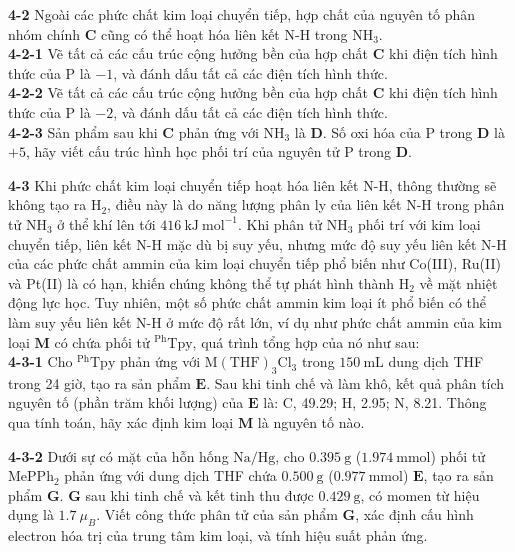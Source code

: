 \vspace{0.2cm}

\noindent
\textbf{4-2} Ngoài các phức chất kim loại chuyển tiếp, hợp chất của nguyên tố phân nhóm chính $\mathbf{C}$ cũng có thể hoạt hóa liên kết N-H trong $\mathrm{NH_3}$. \\
\textbf{4-2-1} Vẽ tất cả các cấu trúc cộng hưởng bền của hợp chất $\mathbf{C}$ khi điện tích hình thức của $\mathrm{P}$ là $-1$, và đánh dấu tất cả các điện tích hình thức. \\
\textbf{4-2-2} Vẽ tất cả các cấu trúc cộng hưởng bền của hợp chất $\mathbf{C}$ khi điện tích hình thức của $\mathrm{P}$ là $-2$, và đánh dấu tất cả các điện tích hình thức. \\
\textbf{4-2-3} Sản phẩm sau khi $\mathbf{C}$ phản ứng với $\mathrm{NH_3}$ là $\mathbf{D}$. Số oxi hóa của $\mathrm{P}$ trong $\mathbf{D}$ là $+5$, hãy viết cấu trúc hình học phối trí của nguyên tử $\mathrm{P}$ trong $\mathbf{D}$.

\vspace{0.2cm}

\noindent
\textbf{4-3} Khi phức chất kim loại chuyển tiếp hoạt hóa liên kết N-H, thông thường sẽ không tạo ra $\mathrm{H_2}$, điều này là do năng lượng phân ly của liên kết N-H trong phân tử $\mathrm{NH_3}$ ở thể khí lên tới $416\ \mathrm{kJ\ mol^{-1}}$. Khi phân tử $\mathrm{NH_3}$ phối trí với kim loại chuyển tiếp, liên kết N-H mặc dù bị suy yếu, nhưng mức độ suy yếu liên kết N-H của các phức chất ammin của kim loại chuyển tiếp phổ biến như Co(III), Ru(II) và Pt(II) là có hạn, khiến chúng không thể tự phát hình thành $\mathrm{H_2}$ về mặt nhiệt động lực học. Tuy nhiên, một số phức chất ammin kim loại ít phổ biến có thể làm suy yếu liên kết N-H ở mức độ rất lớn, ví dụ như phức chất ammin của kim loại $\mathbf{M}$ có chứa phối tử $\mathrm{^{Ph}Tpy}$, quá trình tổng hợp của nó như sau: \\
\textbf{4-3-1} Cho $\mathrm{^{Ph}Tpy}$ phản ứng với $\mathrm{M(THF)_3Cl_3}$ trong $150\ \mathrm{mL}$ dung dịch THF trong 24 giờ, tạo ra sản phẩm $\mathbf{E}$. Sau khi tinh chế và làm khô, kết quả phân tích nguyên tố (phần trăm khối lượng) của $\mathbf{E}$ là: C, 49.29; H, 2.95; N, 8.21. Thông qua tính toán, hãy xác định kim loại $\mathbf{M}$ là nguyên tố nào.

\noindent
\textbf{4-3-2} Dưới sự có mặt của hỗn hống $\mathrm{Na/Hg}$, cho $0.395\ \mathrm{g}$ ($1.974\ \mathrm{mmol}$) phối tử $\mathrm{MePPh_2}$ phản ứng với dung dịch THF chứa $0.500\ \mathrm{g}$ ($0.977\ \mathrm{mmol}$) $\mathbf{E}$, tạo ra sản phẩm $\mathbf{G}$. $\mathbf{G}$ sau khi tinh chế và kết tinh thu được $0.429\ \mathrm{g}$, có momen từ hiệu dụng là $1.7\ \mu_B$. Viết công thức phân tử của sản phẩm $\mathbf{G}$, xác định cấu hình electron hóa trị của trung tâm kim loại, và tính hiệu suất phản ứng.

